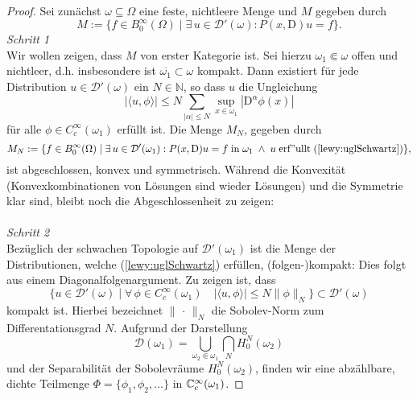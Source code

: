 \begin{proof}
Sei zunächst $\omega\subseteq\Omega$ eine feste, nichtleere Menge und $M$ gegeben durch
\begin{equation}
M:=\{f\in B_0^\infty(\Omega)\mid \exists\,u\in\mathscr{D}'(\omega) : P(x,\mathrm{D})u=f\}.
\end{equation}
\textit{Schritt 1}\\
Wir wollen zeigen, dass $M$ von erster Kategorie ist. Sei hierzu $\omega_1\Subset\omega$ offen und nichtleer, d.h. insbesondere ist $\overline{\omega_1}\subset\omega$ kompakt. Dann existiert für jede Distribution $u\in\mathscr{D}'(\omega)$ ein $N\in\mathbb{N}$, so dass $u$ die Ungleichung
\begin{equation}\label{lewy:uglSchwartz}
|\langle u,\phi\rangle|\leq N\sum_{|\alpha|\leq N}\sup\limits_{x\in\omega_1} |\mathrm{D}^\alpha \phi(x)| 
\end{equation}
für alle $\phi\in C_c^\infty(\omega_1)$ erfüllt ist. Die Menge $M_N$, gegeben durch
\begin{equation}
M_N:= \{f\in B_0^\infty(\Omega)\mid \exists\,u\in\mathcal D'(\omega_1): P(x,\mathrm{D})u=f\;\mathrm{in}\;\omega_1\;\wedge\; u\mathrm{\;erf"ullt\;}(\ref{lewy:uglSchwartz})\},
\end{equation}
ist abgeschlossen, konvex und symmetrisch. Während die Konvexität (Konvexkombinationen von Lösungen sind wieder Lösungen) und die Symmetrie klar sind, bleibt noch die Abgeschlossenheit zu zeigen:\\\\
\textit{Schritt 2}\\
Bezüglich der schwachen Topologie auf $\mathscr{D}'(\omega_1)$ ist die Menge der Distributionen, welche (\ref{lewy:uglSchwartz}) erfüllen, (folgen-)kompakt: Dies folgt aus einem Diagonalfolgenargument. Zu zeigen ist, dass
\begin{equation}
\{u\in\mathscr D'(\omega)\mid \forall\,\phi\in C_c^\infty(\omega_1)\quad |\langle u,\phi\rangle|\leq N \|\phi\|_N\}\subset\mathscr D'(\omega)
\end{equation}
kompakt ist. Hierbei bezeichnet $\|\,\cdot\,\|_N$ die Sobolev-Norm zum Differentationsgrad $N$. 
Aufgrund der Darstellung
\begin{equation}
\mathscr D(\omega_1)=\bigcup\limits_{\omega_2\Subset\omega_1}\bigcap\limits_N H_0^N(\omega_2)
\end{equation}
und der Separabilität der Sobolevräume $H_0^N(\omega_2)$, finden wir eine abzählbare, dichte Teilmenge $\Phi=\{\phi_1,\phi_2,\ldots\}$ in $\mathbb C_c^\infty(\omega_1)$.

\end{proof}
